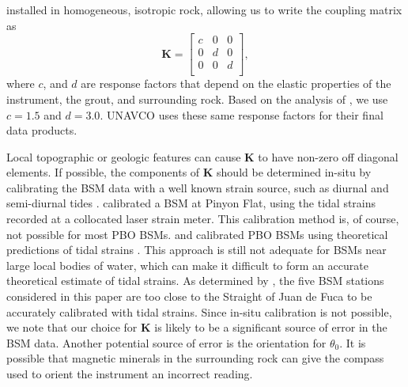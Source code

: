 installed in homogeneous, isotropic rock, allowing us to write the
coupling matrix as
\begin{equation}\label{ch6:eq:CouplingMatrix}
\mathbf{K} = 
\left[\begin{array}{ccc}
c & 0 & 0 \\
0 & d & 0 \\
0 & 0 & d \\
\end{array}\right],
\end{equation}  
where $c$, and $d$ are response factors that depend on the elastic
properties of the instrument, the grout, and surrounding rock. Based
on the analysis of \citet{Gladwin1985}, we use $c=1.5$ and $d=3.0$.
UNAVCO uses these same response factors for their final data products.

Local topographic or geologic features can cause $\mathbf{K}$ to have
non-zero off diagonal elements. If possible, the components of
$\mathbf{K}$ should be determined in-situ by calibrating the BSM data
with a well known strain source, such as diurnal and semi-diurnal
tides \citep{Hart1996,Roeloffs2010,Hodgkinson2013}. \citet{Hart1996}
calibrated a BSM at Pinyon Flat, using the tidal strains recorded at a
collocated laser strain meter. This calibration method is, of course,
not possible for most PBO BSMs. \citet{Roeloffs2010} and
\citet{Hodgkinson2013} calibrated PBO BSMs using theoretical
predictions of tidal strains \citep[e.g.,][]{Agnew1997}. This approach
is still not adequate for BSMs near large local bodies of water, which
can make it difficult to form an accurate theoretical estimate of
tidal strains. As determined by \citet{Roeloffs2010}, the five BSM
stations considered in this paper are too close to the Straight of
Juan de Fuca to be accurately calibrated with tidal strains. Since
in-situ calibration is not possible, we note that our choice for
$\mathbf{K}$ is likely to be a significant source of error in the BSM
data. Another potential source of error is the orientation for
$\theta_0$. It is possible that magnetic minerals in the surrounding
rock can give the compass used to orient the instrument an incorrect
reading.

